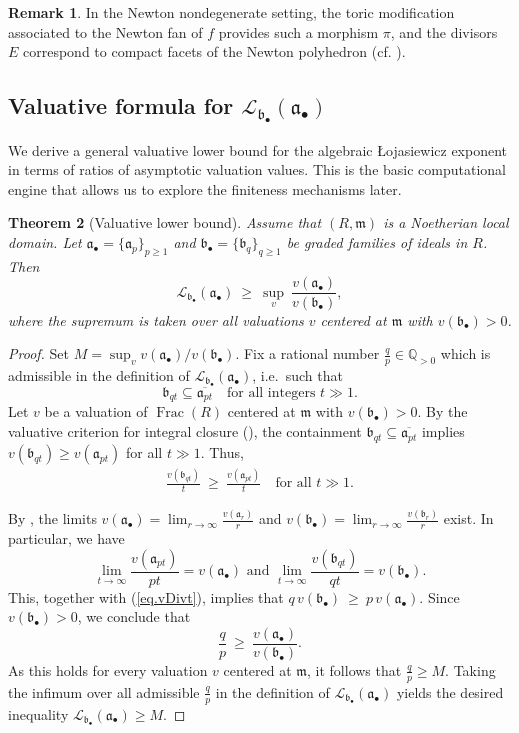 \documentclass[12pt]{amsart}
\newcommand{\QQ}{\mathbb{Q}}
\newcommand{\m}{\mathfrak m}
\renewcommand{\a}{\mathfrak{a}}
\renewcommand{\b}{\mathfrak{b}}
\newcommand{\Loj}{\mathcal{L}} %
\DeclareMathOperator{\Frac}{Frac}
\newcommand{\abul}{{\a_\bullet}}
\newcommand{\bbul}{{\b_\bullet}}
\theoremstyle{plain}
\newtheorem{theorem}{Theorem}[section]
\theoremstyle{definition}
\newtheorem{remark}[theorem]{Remark}
\numberwithin{equation}{section}
\begin{document}
\begin{remark}
	In the Newton nondegenerate setting, the toric modification associated to the
	Newton fan of $f$ provides such a morphism $\pi$, and the divisors $E$ correspond
	to compact facets of the Newton polyhedron (cf. \cite{CLS,Khovanskii,Oka}).
\end{remark}


\subsection{Valuative formula for $\Loj_{\bbul}(\abul)$}
We derive a general valuative lower bound for the algebraic \L{}ojasiewicz
exponent in terms of ratios of asymptotic valuation values. This is the basic computational engine that allows us to explore the finiteness mechanisms later.

\begin{theorem}[Valuative lower bound]\label{thm:valuative-filtrations}
	Assume that $(R,\m)$ is a Noetherian local domain. Let $\abul=\{\a_p\}_{p\ge1}$ and
	$\bbul=\{\b_q\}_{q\ge1}$ be graded families of ideals in $R$.
	Then
	\[
	\Loj_{\bbul}(\abul)\ \ge\ \sup_{v}\ \frac{v(\abul)}{v(\bbul)},
	\]
	where the supremum is taken over all valuations $v$ centered at $\m$ with $v(\bbul) > 0$.
\end{theorem}

\begin{proof} Set $M = \sup_v {v(\abul)}/{v(\bbul)}.$ 
	Fix a rational number $\frac{q}{p}\in\QQ_{>0}$ which is admissible in the definition of
	$\Loj_{\bbul}(\abul)$, i.e.\ such that
	\[
	\b_{qt}\subseteq \overline{\a_{pt}}
	\quad\text{for all integers }t\gg 1.
	\]
	Let $v$ be a valuation of $\Frac(R)$ centered at $\m$ with $v(\bbul) > 0$.
	By the valuative criterion for integral closure (), the containment
	$\b_{qt}\subseteq \overline{\a_{pt}}$ implies $v(\b_{qt}) \ge v(\a_{pt})$ for all $t \gg 1$. Thus,
	\begin{align}
	\frac{v(\b_{qt})}{t}\ \ge\ \frac{v(\a_{pt})}{t}
	\quad\text{for all } t\gg 1. \label{eq.vDivt}
	\end{align}
	
	By , the limits $v(\abul)=\lim_{r\to\infty}\frac{v(\a_r)}{r}$ and $v(\bbul)=\lim_{r\to\infty}\frac{v(\b_r)}{r}$
	exist. In particular, we have
	\[
	\lim_{t\to\infty}\frac{v(\a_{pt})}{pt}=v(\abul)
	\text{ and }
	\lim_{t\to\infty}\frac{v(\b_{qt})}{qt}=v(\bbul).
	\]
This, together with (\ref{eq.vDivt}), implies that $q\,v(\bbul)\ \ge\ p\,v(\abul).$
	Since $v(\bbul)>0$, we conclude that
	\[
	\frac{q}{p}\ \ge\ \frac{v(\abul)}{v(\bbul)}.
	\]
	As this holds for every valuation $v$ centered at $\m$, it follows that $\frac{q}{p} \ge M.$
Taking the infimum over all admissible $\frac{q}{p}$ in the definition of
	$\Loj_{\bbul}(\abul)$ yields the desired inequality $\Loj_{\bbul}(\abul) \ge M$.
\end{proof}
\end{document}
